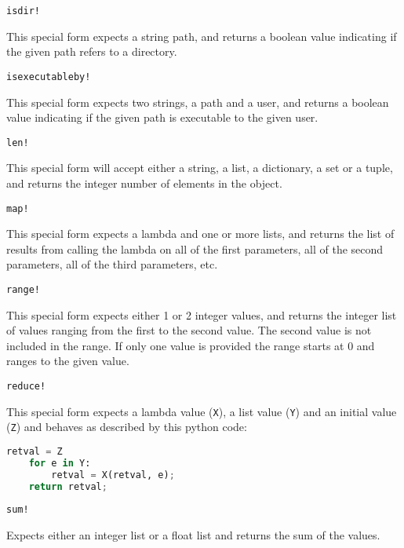{\begin{itemize}
{		\item[] \texttt{isdir!}
		
			This special form expects a string path, and returns
			a boolean value indicating if the given path refers to a
			directory.
		
		\item[] \texttt{isexecutableby!}
		
			This special form expects two strings, a path and a user, and
			returns a boolean value indicating if the given path is
			executable to the given user.
		
		\item[] \texttt{len!}
			
			This special form will accept either a string, a list, a dictionary,
			a set or a tuple, and returns the integer number of elements in
			the object.
		
		\item[] \texttt{map!}
		
			This special form expects a lambda and one or more lists,
			and returns the list of results from calling the lambda on all
			of the first parameters, all of the second parameters, all of the
			third parameters, etc.
		
		\item[] \texttt{range!}
		
			This special form expects either 1 or 2 integer values,
			and returns the integer list of values ranging from the first to
			the second value. The second value is not included in the range.
			If only one value is provided the range starts at 0 and ranges
			to the given value.
		
		\item[] \texttt{reduce!}
		
			This special form expects a lambda value (\texttt{X}),
			a list value (\texttt{Y}) and an initial value (\texttt{Z})
			and behaves as described by this python code:
\begin{lstlisting}[language=Python]
	retval = Z
	for e in Y:
		retval = X(retval, e);
	return retval;
\end{lstlisting}
		
		\item[] \texttt{sum!}
		
			Expects either an integer list or a float list and returns
			the sum of the values.
	}
	\end{itemize}
	
}











